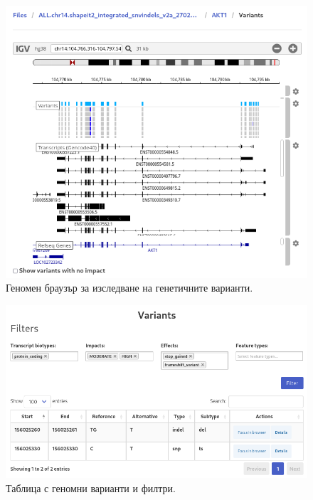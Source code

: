 \documentclass[pdftex,cyrillic,14pt,a4page,twoside,openright]{extreport}
\begin{document}
\begin{figure}[ht]
  \centering
  \includegraphics[width=16cm]{figures/genome_browser}
  \caption {Геномен браузър за изследване на генетичните варианти.}
  \label{fig:genome_browser}
\end{figure}

\begin{figure}[ht]
  \centering
  \includegraphics[width=16cm]{figures/variants_list}
  \caption {Таблица с геномни варианти и филтри.}
  \label{fig:variants_list}
\end{figure}
\end{document}
